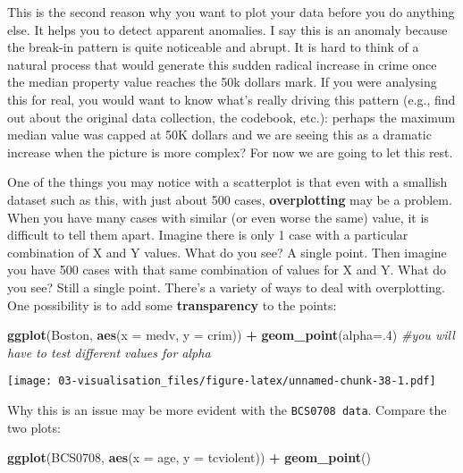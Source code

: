 \documentclass[
]{book}
\newenvironment{Shaded}{\begin{snugshade}}{\end{snugshade}}
\newcommand{\AttributeTok}[1]{\textcolor[rgb]{0.13,0.29,0.53}{#1}}
\newcommand{\CommentTok}[1]{\textcolor[rgb]{0.56,0.35,0.01}{\textit{#1}}}
\newcommand{\DecValTok}[1]{\textcolor[rgb]{0.00,0.00,0.81}{#1}}
\newcommand{\FunctionTok}[1]{\textcolor[rgb]{0.13,0.29,0.53}{\textbf{#1}}}
\newcommand{\NormalTok}[1]{#1}
\newcommand{\SpecialCharTok}[1]{\textcolor[rgb]{0.81,0.36,0.00}{\textbf{#1}}}
\begin{document}
This is the second reason why you want to plot your data before you do anything else. It helps you to detect apparent anomalies. I say this is an anomaly because the break-in pattern is quite noticeable and abrupt. It is hard to think of a natural process that would generate this sudden radical increase in crime once the median property value reaches the 50k dollars mark. If you were analysing this for real, you would want to know what's really driving this pattern (e.g., find out about the original data collection, the codebook, etc.): perhaps the maximum median value was capped at 50K dollars and we are seeing this as a dramatic increase when the picture is more complex? For now we are going to let this rest.

One of the things you may notice with a scatterplot is that even with a smallish dataset such as this, with just about 500 cases, \textbf{overplotting} may be a problem. When you have many cases with similar (or even worse the same) value, it is difficult to tell them apart. Imagine there is only 1 case with a particular combination of X and Y values. What do you see? A single point. Then imagine you have 500 cases with that same combination of values for X and Y. What do you see? Still a single point. There's a variety of ways to deal with overplotting. One possibility is to add some \textbf{transparency} to the points:

\begin{Shaded}
\begin{Highlighting}[]
\FunctionTok{ggplot}\NormalTok{(Boston, }\FunctionTok{aes}\NormalTok{(}\AttributeTok{x =}\NormalTok{ medv, }\AttributeTok{y =}\NormalTok{ crim)) }\SpecialCharTok{+}
  \FunctionTok{geom\_point}\NormalTok{(}\AttributeTok{alpha=}\NormalTok{.}\DecValTok{4}\NormalTok{) }\CommentTok{\#you will have to test different values for alpha}
\end{Highlighting}
\end{Shaded}

\texttt{[image: 03-visualisation\_files/figure-latex/unnamed-chunk-38-1.pdf]}

Why this is an issue may be more evident with the \texttt{BCS0708\ data}. Compare the two plots:

\begin{Shaded}
\begin{Highlighting}[]
\FunctionTok{ggplot}\NormalTok{(BCS0708, }\FunctionTok{aes}\NormalTok{(}\AttributeTok{x =}\NormalTok{ age, }\AttributeTok{y =}\NormalTok{ tcviolent)) }\SpecialCharTok{+}
  \FunctionTok{geom\_point}\NormalTok{()}
\end{Highlighting}
\end{Shaded}
\end{document}
